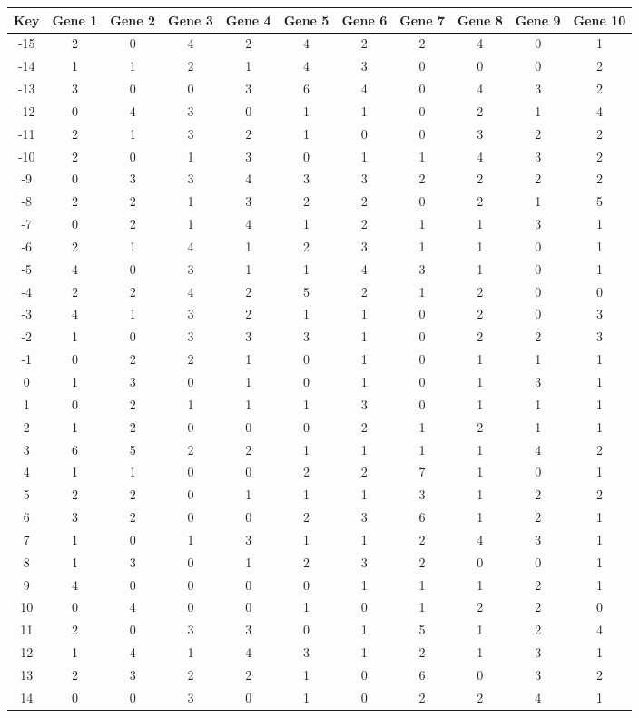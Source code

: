 \begin{tabular}{|c|c|c|c|c|c|c|c|c|c|c|}
\hline
Key & Gene 1 & Gene 2 & Gene 3 & Gene 4 & Gene 5 & Gene 6 & Gene 7 & Gene 8 & Gene 9 & Gene 10 \\
\hline
-15 & 2 & 0 & 4 & 2 & 4 & 2 & 2 & 4 & 0 & 1 \\
-14 & 1 & 1 & 2 & 1 & 4 & 3 & 0 & 0 & 0 & 2 \\
-13 & 3 & 0 & 0 & 3 & 6 & 4 & 0 & 4 & 3 & 2 \\
-12 & 0 & 4 & 3 & 0 & 1 & 1 & 0 & 2 & 1 & 4 \\
-11 & 2 & 1 & 3 & 2 & 1 & 0 & 0 & 3 & 2 & 2 \\
-10 & 2 & 0 & 1 & 3 & 0 & 1 & 1 & 4 & 3 & 2 \\
-9 & 0 & 3 & 3 & 4 & 3 & 3 & 2 & 2 & 2 & 2 \\
-8 & 2 & 2 & 1 & 3 & 2 & 2 & 0 & 2 & 1 & 5 \\
-7 & 0 & 2 & 1 & 4 & 1 & 2 & 1 & 1 & 3 & 1 \\
-6 & 2 & 1 & 4 & 1 & 2 & 3 & 1 & 1 & 0 & 1 \\
-5 & 4 & 0 & 3 & 1 & 1 & 4 & 3 & 1 & 0 & 1 \\
-4 & 2 & 2 & 4 & 2 & 5 & 2 & 1 & 2 & 0 & 0 \\
-3 & 4 & 1 & 3 & 2 & 1 & 1 & 0 & 2 & 0 & 3 \\
-2 & 1 & 0 & 3 & 3 & 3 & 1 & 0 & 2 & 2 & 3 \\
-1 & 0 & 2 & 2 & 1 & 0 & 1 & 0 & 1 & 1 & 1 \\
0 & 1 & 3 & 0 & 1 & 0 & 1 & 0 & 1 & 3 & 1 \\
1 & 0 & 2 & 1 & 1 & 1 & 3 & 0 & 1 & 1 & 1 \\
2 & 1 & 2 & 0 & 0 & 0 & 2 & 1 & 2 & 1 & 1 \\
3 & 6 & 5 & 2 & 2 & 1 & 1 & 1 & 1 & 4 & 2 \\
4 & 1 & 1 & 0 & 0 & 2 & 2 & 7 & 1 & 0 & 1 \\
5 & 2 & 2 & 0 & 1 & 1 & 1 & 3 & 1 & 2 & 2 \\
6 & 3 & 2 & 0 & 0 & 2 & 3 & 6 & 1 & 2 & 1 \\
7 & 1 & 0 & 1 & 3 & 1 & 1 & 2 & 4 & 3 & 1 \\
8 & 1 & 3 & 0 & 1 & 2 & 3 & 2 & 0 & 0 & 1 \\
9 & 4 & 0 & 0 & 0 & 0 & 1 & 1 & 1 & 2 & 1 \\
10 & 0 & 4 & 0 & 0 & 1 & 0 & 1 & 2 & 2 & 0 \\
11 & 2 & 0 & 3 & 3 & 0 & 1 & 5 & 1 & 2 & 4 \\
12 & 1 & 4 & 1 & 4 & 3 & 1 & 2 & 1 & 3 & 1 \\
13 & 2 & 3 & 2 & 2 & 1 & 0 & 6 & 0 & 3 & 2 \\
14 & 0 & 0 & 3 & 0 & 1 & 0 & 2 & 2 & 4 & 1 \\
\hline
\end{tabular}